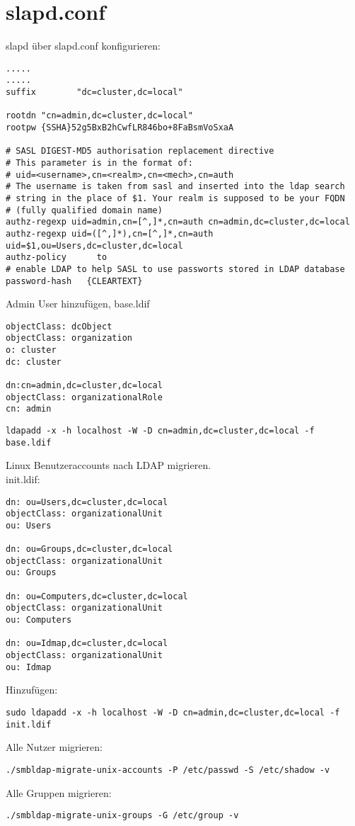 \section{slapd.conf}
slapd über slapd.conf konfigurieren:
\begin{lstlisting}[style=Bash]
.....
.....
suffix        "dc=cluster,dc=local"

rootdn "cn=admin,dc=cluster,dc=local"
rootpw {SSHA}52g5BxB2hCwfLR846bo+8FaBsmVoSxaA

# SASL DIGEST-MD5 authorisation replacement directive
# This parameter is in the format of:
# uid=<username>,cn=<realm>,cn=<mech>,cn=auth
# The username is taken from sasl and inserted into the ldap search 
# string in the place of $1. Your realm is supposed to be your FQDN 
# (fully qualified domain name)
authz-regexp uid=admin,cn=[^,]*,cn=auth cn=admin,dc=cluster,dc=local
authz-regexp uid=([^,]*),cn=[^,]*,cn=auth uid=$1,ou=Users,dc=cluster,dc=local
authz-policy      to
# enable LDAP to help SASL to use passworts stored in LDAP database
password-hash   {CLEARTEXT}
\end{lstlisting}
Admin User hinzufügen, base.ldif
\begin{lstlisting}[style=Bash]
objectClass: dcObject
objectClass: organization
o: cluster
dc: cluster

dn:cn=admin,dc=cluster,dc=local
objectClass: organizationalRole
cn: admin
\end{lstlisting}
\begin{lstlisting}[style=Bash]
ldapadd -x -h localhost -W -D cn=admin,dc=cluster,dc=local -f base.ldif 
\end{lstlisting}
Linux Benutzeraccounts nach LDAP migrieren.\\
init.ldif:
\begin{lstlisting}[style=Bash]
dn: ou=Users,dc=cluster,dc=local
objectClass: organizationalUnit
ou: Users

dn: ou=Groups,dc=cluster,dc=local
objectClass: organizationalUnit
ou: Groups

dn: ou=Computers,dc=cluster,dc=local
objectClass: organizationalUnit
ou: Computers

dn: ou=Idmap,dc=cluster,dc=local
objectClass: organizationalUnit
ou: Idmap
\end{lstlisting}
Hinzufügen:
\begin{lstlisting}[style=Bash]
sudo ldapadd -x -h localhost -W -D cn=admin,dc=cluster,dc=local -f init.ldif
\end{lstlisting}
Alle Nutzer migrieren:
\begin{lstlisting}[style=Bash]
./smbldap-migrate-unix-accounts -P /etc/passwd -S /etc/shadow -v
\end{lstlisting}
Alle Gruppen migrieren:
\begin{lstlisting}[style=Bash]
./smbldap-migrate-unix-groups -G /etc/group -v 
\end{lstlisting}
